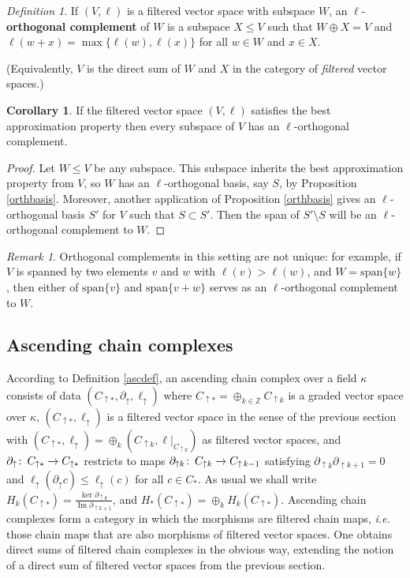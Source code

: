 \documentclass[11pt]{amsart}
\theoremstyle{definition}
\newtheorem{cor}[theorem]{Corollary}
\theoremstyle{remark}
\newtheorem{dfn}[theorem]{Definition}
\newtheorem{remark}[theorem]{Remark}
\numberwithin{equation}{section}
\def\co{\colon\thinspace}
\def\Z{\mathbb{Z}}
\DeclareMathOperator{\Img}{Im}
\begin{document}
\begin{dfn}
	If $(V,\ell)$ is a filtered vector space with subspace $W$, an $\ell$-\textbf{orthogonal complement} of $W$ is a subspace $X\leq V$ such that $W\oplus X=V$ and $\ell(w+x)=\max\{\ell(w),\ell(x)\}$ for all $w\in W$ and $x\in X$.
\end{dfn}

(Equivalently, $V$ is the direct sum of $W$ and $X$ in the category of \emph{filtered} vector spaces.)

\begin{cor}\label{orthcomp}
	If the filtered vector space $(V,\ell)$ satisfies the best approximation property then every subspace of $V$ has an $\ell$-orthogonal complement.
\end{cor}

\begin{proof} Let $W\leq V$ be any subspace.  This subspace inherits the best approximation property from $V$, so $W$ has an $\ell$-orthogonal basis, say $S$, by Proposition \ref{orthbasis}. Moreover, another application of Proposition \ref{orthbasis} gives an $\ell$-orthogonal basis $S'$ for $V$ 
	such that $S\subset S'$.  Then the span of $S'\setminus S$ will be an $\ell$-orthogonal complement to $W$.
\end{proof}

\begin{remark} Orthogonal complements in this setting are not unique: for example, if $V$ is spanned by two elements $v$ and $w$ with $\ell(v)>\ell(w)$, and $W=\mathrm{span}\{w\}$, then either of $\mathrm{span}\{v\}$ and $\mathrm{span}\{v+w\}$ serves as an $\ell$-orthogonal complement to $W$.
\end{remark}


\subsection{Ascending chain complexes}\label{fcc}
According to Definition \ref{ascdef}, an ascending chain complex over a field $\kappa$ consists of data $(C_{\uparrow*},\partial_{\uparrow},\ell_{\uparrow})$ where $C_{\uparrow *}=\oplus_{k\in \Z}C_{\uparrow k}$ is a graded vector space over $\kappa$, $(C_{\uparrow*},\ell_{\uparrow})$ is a filtered vector space in the sense of the previous section with $(C_{\uparrow*},\ell_{\uparrow})=\oplus_k(C_{\uparrow k},\ell|_{C_{\uparrow k}})$ as filtered vector spaces, and $\partial_{\uparrow}\co C_{\uparrow *}\to C_{\uparrow *}$ restricts to maps $\partial_{\uparrow k}\co C_{\uparrow k}\to C_{\uparrow\, k-1}$ satisfying $\partial_{\uparrow k}\partial_{\uparrow k+1}=0$ and $\ell_{\uparrow}(\partial_{\uparrow} c)\leq \ell_{\uparrow}(c)$ for all $c\in C_*$.  As usual we shall write $H_k(C_{\uparrow*})=\frac{\ker\partial_{\uparrow k}}{\Img\partial_{\uparrow k+1}}$, and $H_*(C_{\uparrow *})=\oplus_kH_k(C_{\uparrow *})$.  Ascending chain complexes form a category in which the morphisms are filtered chain maps, \emph{i.e.} those chain maps that are also morphisms of filtered vector spaces.  One obtains direct sums of filtered chain complexes in the obvious way, extending the notion of a direct sum of filtered vector spaces from the previous section.
\end{document}
